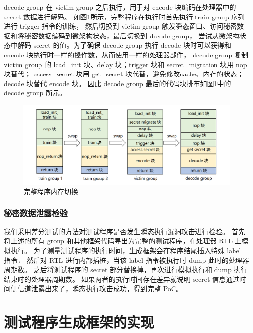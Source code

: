 decode group 在 victim group 之后执行，用于对 encode 块编码在处理器中的 secret 数据进行解码。
如图\ref{paper:group-switch-all}所示，完整程序在执行时首先执行 train group 序列进行 trigger 指令的训练，
然后切换到 victim group 触发瞬态窗口、访问秘密数据和将秘密数据编码到微架构状态，最后切换到 decode group，
尝试从微架构状态中解码 secret 的值。为了确保 decode group 执行 decode 块时可以获得和 encode 块执行时一样的操作数，从而使用一样的处理器部件，
decode group 复制 victim group 的 load\_init 块、delay 块；trigger 块和 secret\_migration 块用 nop 块替代；
access\_secret 块用 get\_secret 块代替，避免修改cache、内存的状态；decode 块替代 encode 块。
因此 decode group 最后的代码块排布如图\ref{paper:group-switch-all}中的 decode group 所示。\par

\begin{figure}[!h]
    \centering
    \includegraphics[width=\linewidth]{figure/paper/group-switch-all.png}
    \caption{完整程序内存切换}
    \label{paper:group-switch-all}
\end{figure}

\subsubsection{秘密数据泄露检验}

我们采用差分测试的方法对测试程序是否发生瞬态执行漏洞攻击进行检验。
首先将上述的所有 group 和其他框架代码导出为完整的测试程序，在处理器 RTL 上模拟执行。
为了测量测试程序的执行时间，生成框架会在程序结尾插入特殊 label 指令，
然后对 RTL 进行内部插桩，当该 label 指令被执行时 dump 此时的处理器周期数。
之后将测试程序的 secret 部分替换掉，再次进行模拟执行和 dump 执行结束时的处理器周期数。
如果两者的执行时间存在差异就说明 secret 信息通过时间侧信道泄露出来了，瞬态执行攻击成功，得到完整 PoC。

\section{测试程序生成框架的实现}

